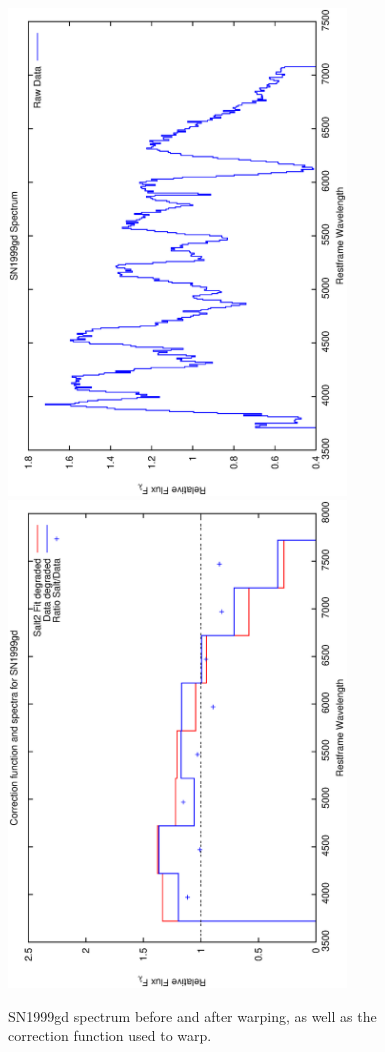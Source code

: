 \clearpage

\begin{figure}[p]
\centering
\includegraphics[angle=-90,width=0.8\textwidth]{./figures/spectrabeforeafter/SN1999gd_handpicked_v001_v027_before_after_spectra.ps}
\hfill
\includegraphics[angle=-90,width=0.8\textwidth]{./figures/corrections/SN1999gd_v001_correction.ps}
\hfill
\caption{SN1999gd spectrum before and after warping, as well as the correction function used to warp.}
\label{fig:SN1999gdfour1}
\end{figure}

